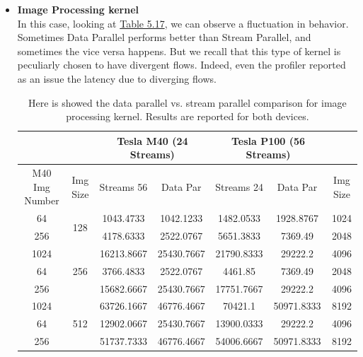 \begin{itemize}
	
	\item \textbf{Image Processing kernel}\\
	In this case, looking at \hyperref[tab:imgdataparVSsm]{Table 5.17}, we can observe a fluctuation in behavior.\\
	Sometimes Data Parallel performs better than Stream Parallel, and sometimes the vice versa happens. But we recall that this type of kernel is peculiarly chosen to have divergent flows. Indeed, even the profiler reported as an issue the latency due to diverging flows.
	\begin{table}
		\centering
		\begin{tabular}{ | c  c || c | c  || c | c || c|| } 
			\hline
			& &  \multicolumn{2}{c}{\textbf{Tesla M40 (24 Streams)}}& \multicolumn{2}{c}{\textbf{Tesla P100 (56 Streams)}}& \\ [0.5ex]
			\hline							M40	
			Img Number&	Img Size&	Streams 56&	Data Par&	Streams 24&	Data Par	& Img Size\\
			\hline	\hline	
			64&	\multirow{2}{*}{128}&	1043.4733&	1042.1233&	1482.0533&	1928.8767&	1024\\
			256	& &	4178.6333&	2522.0767&	5651.3833&	7369.49&	2048\\
			1024& &	16213.8667&	25430.7667&	21790.8333&	29222.2&	4096\\
			\hline	
			64&	\multirow{1}{*}{256} & 3766.4833 & 2522.0767 & 4461.85&	7369.49&	2048\\
			256	& &	15682.6667&	25430.7667&	17751.7667&	29222.2&	4096\\
			1024 & & 63726.1667&	46776.4667&	70421.1&	50971.8333&	8192\\
			\hline	
			64&	\multirow{1}{*}{512} & 12902.0667 & 25430.7667&	13900.0333 & 29222.2 & 4096\\
			256& &	51737.7333&	46776.4667&	54006.6667&	50971.8333&	8192\\
			
		\hline			
		\end{tabular}
		\caption{Here is showed the data parallel vs. stream parallel comparison for image processing kernel. Results are reported for both devices.}	
		\label{tab:imgdataparVSsm}		
	\end{table}
	
	
\end{itemize}


